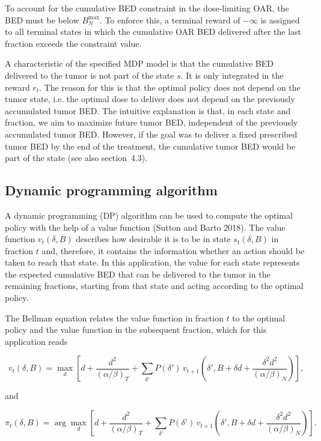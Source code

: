 \documentclass[11pt]{article}
\begin{document}
To account for the cumulative BED constraint in the dose-limiting OAR, the BED must be below $B_N^{\max}$. To enforce this, a terminal reward of $-\infty$ is assigned to all terminal states in which the cumulative OAR BED delivered after the last fraction exceeds the constraint value.

A characteristic of the specified MDP model is that the cumulative BED delivered to the tumor is not part of the state $s$. It is only integrated in the reward $r_t$. The reason for this is that the optimal policy does not depend on the tumor state, i.e. the optimal dose to deliver does not depend on the previously accumulated tumor BED. The intuitive explanation is that, in each state and fraction, we aim to maximize future tumor BED, independent of the previously accumulated tumor BED. However, if the goal was to deliver a fixed prescribed tumor BED by the end of the treatment, the cumulative tumor BED would be part of the state (see also section~4.3).

\subsection{Dynamic programming algorithm}

A dynamic programming (DP) algorithm can be used to compute the optimal policy with the help of a value function (Sutton and Barto 2018). The value function $v_t(\delta, B)$ describes how desirable it is to be in state $s_t(\delta, B)$ in fraction $t$ and, therefore, it contains the information whether an action should be taken to reach that state. In this application, the value for each state represents the expected cumulative BED that can be delivered to the tumor in the remaining fractions, starting from that state and acting according to the optimal policy.

The Bellman equation relates the value function in fraction $t$ to the optimal policy and the value function in the subsequent fraction, which for this application reads

\begin{equation}
v_t(\delta, B) = \max_{d}\left[d + \frac{d^2}{(\alpha/\beta)_T} + \sum_{\delta'} P(\delta')\, v_{t+1}\left(\delta', B + \delta d + \frac{\delta^2 d^2}{(\alpha/\beta)_N}\right)\right],
\label{eq:bellman}
\end{equation}

and

\begin{equation}
\pi_t(\delta, B) = \arg\max_{d}\left[d + \frac{d^2}{(\alpha/\beta)_T} + \sum_{\delta'} P(\delta')\, v_{t+1}\left(\delta', B + \delta d + \frac{\delta^2 d^2}{(\alpha/\beta)_N}\right)\right].
\label{eq:policy}
\end{equation}
\end{document}
